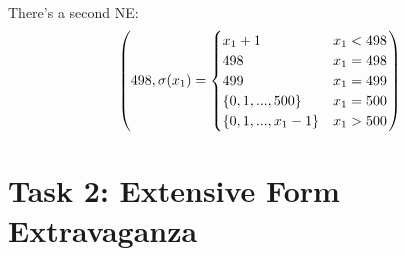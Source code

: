 \documentclass{article}
\begin{document}
\begin{enumerate}[label=(\alph*)]
\begin{align}
		\end{align}
		There's a second NE:
		\begin{align}
			\left(498, \sigma(x_1) = \begin{cases}
				x_1 + 1 & x_1 < 498 \\
				498 & x_1 = 498 \\
				499 & x_1 = 499 \\
				\{0,1,...,500\} & x_1 = 500 \\
				\{0,1,...,x_1-1\} & x_1 > 500
			\end{cases}\right) \notag
		\end{align}
	\end{enumerate}

	\section*{Task 2: Extensive Form Extravaganza}
\end{document}
